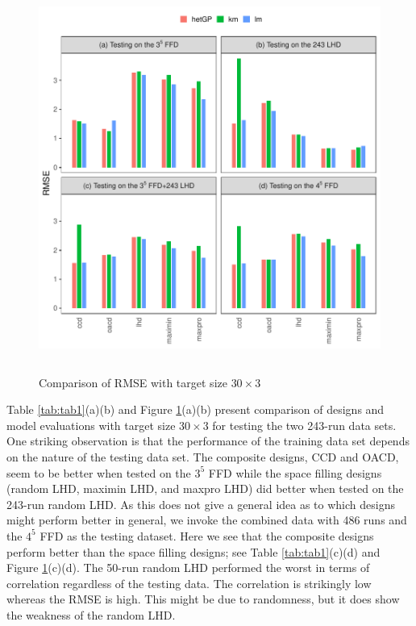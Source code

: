 \documentclass [PhD] {package/uclathes}
\begin{document}
\begin{figure}%
\centering
\includegraphics[height=5in, width=6in]{chapters/DE/pdfs/barplots1}
\caption{Comparison of RMSE with target size $30\times3$}
\label{barplots1}
\end{figure}


{Table \ref{tab:tab1}(a)(b) and Figure \ref{barplots1}(a)(b) present comparison of designs and model evaluations with target size $30\times 3$ for testing the two 243-run data sets.
One striking observation is that the performance of the training data set depends on the nature of the testing data set. The  composite designs, CCD and OACD, seem to be better when tested on the $3^5$ FFD while the space filling designs (random LHD, maximin LHD, and maxpro LHD) did better when tested on the 243-run random LHD.
As this does not give a general idea as to which designs might perform better in general, we invoke the combined data with 486 runs and the $4^5$ FFD as the testing dataset.
Here we see that the composite designs perform better than the space filling designs; see Table \ref{tab:tab1}(c)(d) and Figure \ref{barplots1}(c)(d). The 50-run random LHD performed the worst in terms of correlation regardless of the testing data.  The correlation is strikingly low whereas the RMSE is high. This might be due to randomness, but it does show the weakness of the random LHD.} %
\end{document}
